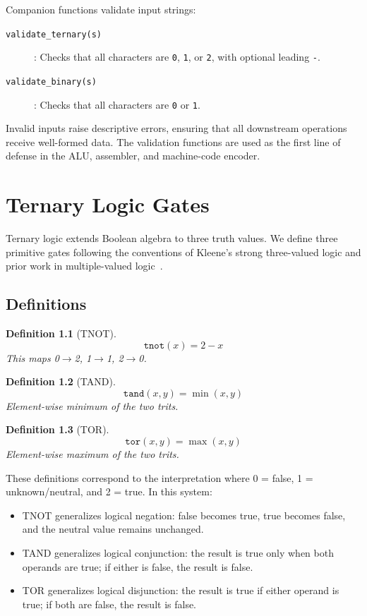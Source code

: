 \documentclass[10pt,a4paper,twoside]{book}
\newtheorem{definition}{Definition}[chapter]
\begin{document}
Companion functions validate input strings:
\begin{description}
    \item[\texttt{validate\_ternary(s)}]: Checks that all characters are \texttt{0},
          \texttt{1}, or \texttt{2}, with optional leading \texttt{-}.
    \item[\texttt{validate\_binary(s)}]: Checks that all characters are \texttt{0}
          or \texttt{1}.
\end{description}

Invalid inputs raise descriptive errors, ensuring that all downstream operations
receive well-formed data. The validation functions are used as the first line of
defense in the ALU, assembler, and machine-code encoder.

\chapter{Ternary Logic Gates}
\label{ch:gates}

Ternary logic extends Boolean algebra to three truth values. We define three primitive
gates following the conventions of Kleene's strong three-valued logic and prior work in
multiple-valued logic~\cite{smith1997mvl,epstein1985mvl}.

\section{Definitions}

\begin{definition}[TNOT]
\[
\texttt{tnot}(x) = 2 - x
\]
This maps 0$\rightarrow$2, 1$\rightarrow$1, 2$\rightarrow$0.
\end{definition}

\begin{definition}[TAND]
\[
\texttt{tand}(x, y) = \min(x, y)
\]
Element-wise minimum of the two trits.
\end{definition}

\begin{definition}[TOR]
\[
\texttt{tor}(x, y) = \max(x, y)
\]
Element-wise maximum of the two trits.
\end{definition}

These definitions correspond to the interpretation where 0 = false, 1 = unknown/neutral,
and 2 = true. In this system:
\begin{itemize}
    \item TNOT generalizes logical negation: false becomes true, true becomes false, and
          the neutral value remains unchanged.
    \item TAND generalizes logical conjunction: the result is true only when both
          operands are true; if either is false, the result is false.
    \item TOR generalizes logical disjunction: the result is true if either operand
          is true; if both are false, the result is false.
\end{itemize}
\end{document}
